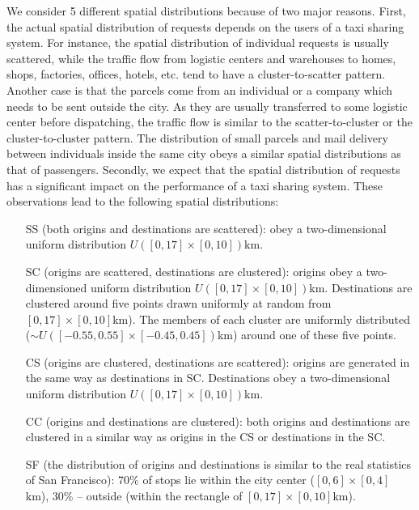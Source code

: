 \documentclass[preprint,authoryear,12pt]{elsarticle}
\begin{document}
We consider 5 different spatial distributions because of two major reasons. First, the actual spatial distribution of requests depends on the users of a taxi sharing system. For instance, the spatial distribution of individual requests is usually scattered, while the traffic flow from logistic centers and warehouses to homes, shops, factories, offices, hotels, etc. tend to have a cluster-to-scatter pattern. Another case is that the parcels come from an individual or a company which needs to be sent outside the city. As they are usually transferred to some logistic center before dispatching, the traffic flow is similar to the scatter-to-cluster or the cluster-to-cluster pattern. The distribution of small parcels and mail delivery between individuals inside the same city obeys a similar spatial distributions as that of passengers. Secondly, we expect that the spatial distribution of requests has a significant impact on the performance of a taxi sharing system. These observations lead to the following spatial distributions:
\begin{itemize}
\item[SS] (both origins and destinations are scattered): obey a two-dimensional uniform distribution  $U([0,17]\times[0,10])$km.

\item[SC] (origins are scattered, destinations are clustered): origins obey a two-dimensioned uniform distribution  $U([0,17]\times[0,10])$km. Destinations are clustered around five points drawn uniformly at random from $[0,17]\times[0,10]$km). The members of each cluster are uniformly distributed ($\sim U([-0.55,0.55]\times[-0.45,0.45])$km) around one of these five points.

\item[CS] (origins are clustered, destinations are scattered): origins are generated in the same way as destinations in SC. Destinations obey a two-dimensional uniform distribution $U([0,17]\times[0,10])$km.

\item[CC] (origins and destinations are clustered): both origins and destinations are clustered in a similar way as origins in the CS or destinations in the SC.

\item[SF] (the distribution of origins and destinations is similar to the real statistics of San Francisco): 70\% of stops lie within the city center ($[0,6]\times[0,4]$ km), 30\% -- outside (within the rectangle of $[0,17]\times[0,10]$km).
\end{itemize}
\end{document}
